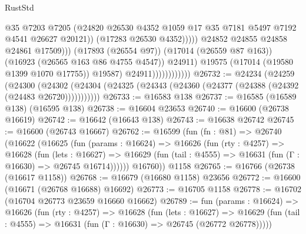 \begin{lexlean}{RustStd}
\begin{coremodule}
                                                @35
                                                @7203
                                                @7205
                                                (@24820
                                                  @26530
                                                  @4352
                                                  @1059
                                                  @17
                                                  @35
                                                  @7181
                                                  @5497
                                                  @7192
                                                  @4541
                                                  @26627
                                                  @20121))
                                              (@17283 @26530 @4352)))))
                                      @24852
                                      @24855
                                      @24858
                                      @24861
                                      @17509)))
                                (@17893 (@26554 @97))
                                (@17014 (@26559 @87 @163))
                                (@16923 (@26565 @163 @86 @4755 @4547))
                                @24911)
                              @19575
                              (@17014 (@19580 @1399 @1070 @17755))
                              @19587)
                            @24911))))))))))))
@26732 := @24234
    (@24259
      (@24300
        (@24302 (@24304 (@24325 (@24343 (@24360 (@24377 (@24388 (@24392 (@24483 @26720)))))))))))
@26733 := @16583 @138
@26737 := @16585 (@16589 @138) (@16595 @138)
@26738 := @16604 @23653
@26740 := @16600 (@26738 @16619)
@26742 := @16642 (@16643 @138)
@26743 := @16638 @26742
@26745 := @16600 (@26743 @16667)
@26762 := @16599
    (fun (fn : @81) =>
    @26740
      (@16622
        (@16625
          (fun (params : @16624) =>
          @16626
            (fun (rty : @4257) =>
            @16628
              (fun (lets : @16627) =>
              @16629 (fun (tail : @4555) => @16631 (fun (Γ : @16630) => @26745 @16714))))))
        @16760))
    @1158
@26765 := @16766 (@26738 (@16617 @1158))
@26768 := @16679 (@16680 @1158) @23656
@26772 := @16600 (@16671 (@26768 @16688) @16692)
@26773 := @16705 @1158
@26778 := @16702 (@16704 @26773 @23659 @16660 @16662)
@26789 := fun (params : @16624) =>
  @16626
    (fun (rty : @4257) =>
    @16628
      (fun (lets : @16627) =>
      @16629 (fun (tail : @4555) => @16631 (fun (Γ : @16630) => @26745 (@26772 @26778)))))

\end{coremodule}
\end{lexlean}

